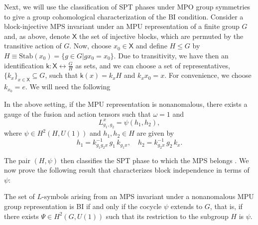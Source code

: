 \documentclass[reprint,
superscriptaddress,
amsmath,amssymb,
notitlepage,
aps,
prb,
10pt, 
tightenlines
]{revtex4-2}
\begin{document}
Next, we will use the classification of SPT phases under MPO group symmetries \cite[Section~4.1]{GarreLootensMolnar} to give a group cohomological characterization of the BI condition. Consider a block-injective MPS invariant under an MPU representation of a finite group $G$ and, as above, denote $\mathsf{X}$ the set of injective blocks, which are permuted by the transitive action of $G$. Now, choose $x_0\in\mathsf{X}$ and define $H\leq G$ by $H\equiv\text{Stab}(x_0)=\{g\in G|gx_0=x_0\}$. Due to transitivity, we have then an identification $\mathsf{k}:\mathsf{X}\leftrightarrow\frac{G}{H}$ as sets, and we can choose a set of representatives, $\{k_x\}_{x\in \mathsf{X}}\subseteq G$, such that $\mathsf{k}(x)=k_xH$ and $k_xx_0=x$. For convenience, we choose $k_{x_0}=e$. We will need the following
\begin{lemma}
\label{lemma:h1h2}
    In the above setting, if the MPU representation is nonanomalous, there exists a gauge of the fusion and action tensors such that $\omega=1$ and 
    \begin{equation}
        L^x_{g_1,g_2}=\psi(h_1,h_2),
        \label{eq:Lcocycle}
    \end{equation}
    where $\psi\in H^2(H, U(1))$ and $h_1, h_2\in H$ are given by
    \begin{equation}
        h_1=k^{-1}_{g_1g_2x}\,g_1\,k_{g_1x}, \quad h_2=k^{-1}_{g_2x}\,g_2\,k_x.
        \label{eq:h1h2}
    \end{equation}
\end{lemma}
The pair $(H, \psi)$ then classifies the SPT phase to which the MPS belongs \cite{GarreLootensMolnar}. We now prove the following result that characterizes block independence in terms of $\psi$:
\begin{proposition}
\label{prop:BI_psi}
    The set of $L$-symbols arising from an MPS invariant under a nonanomalous MPU group representation is BI if and only if the cocycle $\psi$ extends to $G$, that is, if there exists $\Psi\in H^2(G, U(1))$ such that its restriction to the subgroup $H$ is $\psi$.
\end{proposition}
\end{document}
